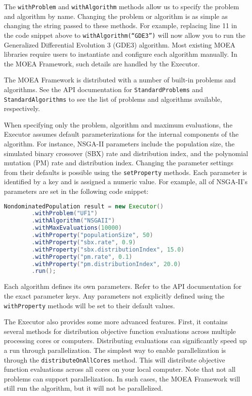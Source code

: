 The \texttt{withProblem} and \texttt{withAlgorithm} methods allow us to specify the problem and algorithm by name.  Changing the problem or algorithm is as simple as changing the string passed to these methods.  For example, replacing line 11 in the code snippet above to \texttt{withAlgorithm(``GDE3'')} will now allow you to run the Generalized Differential Evolution 3 (GDE3) algorithm.  Most existing MOEA libraries require users to instantiate and configure each algorithm manually.  In the MOEA Framework, such details are handled by the Executor.

The MOEA Framework is distributed with a number of built-in problems and algorithms.  See the API documentation for \texttt{StandardProblems} and \texttt{StandardAlgorithms} to see the list of problems and algorithms available, respectively.

When specifying only the problem, algorithm and maximum evaluations, the Executor assumes default parameterizations for the internal components of the algorithm.  For instance, NSGA-II parameters include the population size, the simulated binary crossover (SBX) rate and distribution index, and the polynomial mutation (PM) rate and distribution index.  Changing the parameter settings from their defaults is possible using the \texttt{setProperty} methods.  Each parameter is identified by a key and is assigned a numeric value.  For example, all of NSGA-II's parameters are set in the following code snippet:

\begin{lstlisting}[language=Java]
NondominatedPopulation result = new Executor()
		.withProblem("UF1")
		.withAlgorithm("NSGAII")
		.withMaxEvaluations(10000)
		.withProperty("populationSize", 50)
		.withProperty("sbx.rate", 0.9)
		.withProperty("sbx.distributionIndex", 15.0)
		.withProperty("pm.rate", 0.1)
		.withProperty("pm.distributionIndex", 20.0)
		.run();
\end{lstlisting}

Each algorithm defines its own parameters.  Refer to the API documentation for the exact parameter keys.  Any parameters not explicitly defined using the \texttt{withProperty} methods will be set to their default values.

The Executor also provides some more advanced features.  First, it contains several methods for distribution objective function evaluations across multiple processing cores or computers.  Distributing evaluations can significantly speed up a run through parallelization.  The simplest way to enable parallelization is through the \texttt{distributeOnAllCores} method.  This will distribute objective function evaluations across all cores on your local computer.  Note that not all problems can support parallelization.  In such cases, the MOEA Framework will still run the algorithm, but it will not be parallelized.

